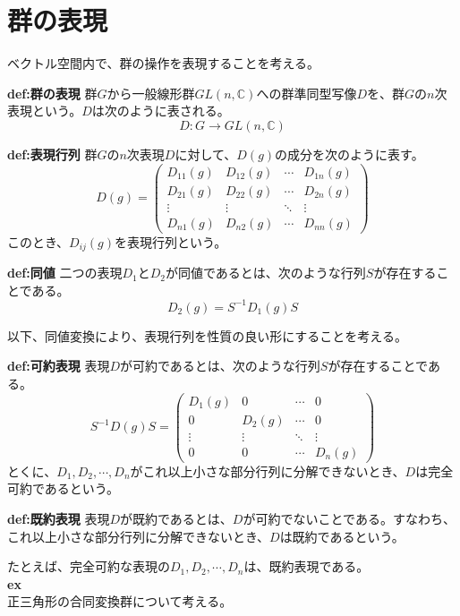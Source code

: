\documentclass[a4paper,11pt]{jsarticle}
\begin{document}
\section{群の表現}
ベクトル空間内で、群の操作を表現することを考える。\\
\begin{itembox}[l]{\textbf{def:群の表現}}
    群$G$から一般線形群$GL(n,\mathbb{C})$への群準同型写像$D$を、群$G$の$n$次表現という。$D$は次のように表される。
    \begin{equation}
        D:G \to GL(n,\mathbb{C})
    \end{equation}
\end{itembox}
\begin{itembox}[l]{\textbf{def:表現行列}}
    群$G$の$n$次表現$D$に対して、$D(g)$の成分を次のように表す。
    \begin{equation}
        D(g) = \begin{pmatrix}
            D_{11}(g) & D_{12}(g) & \cdots & D_{1n}(g)\\
            D_{21}(g) & D_{22}(g) & \cdots & D_{2n}(g)\\
            \vdots & \vdots & \ddots & \vdots\\
            D_{n1}(g) & D_{n2}(g) & \cdots & D_{nn}(g)
        \end{pmatrix}
    \end{equation}
    このとき、$D_{ij}(g)$を表現行列という。
\end{itembox}
\begin{itembox}[l]{\textbf{def:同値}}
    二つの表現$D_1$と$D_2$が同値であるとは、次のような行列$S$が存在することである。
    \begin{equation}
        D_2(g) = S^{-1}D_1(g)S
    \end{equation}
\end{itembox}
以下、同値変換により、表現行列を性質の良い形にすることを考える。\\
\begin{itembox}[l]{\textbf{def:可約表現}}
    表現$D$が可約であるとは、次のような行列$S$が存在することである。
    \begin{equation}
        S^{-1}D(g)S = \begin{pmatrix}
            D_1(g) & 0 & \cdots & 0\\
            0 & D_2(g) & \cdots & 0\\
            \vdots & \vdots & \ddots & \vdots\\
            0 & 0 & \cdots & D_n(g)
        \end{pmatrix}
    \end{equation}
    とくに、$D_1,D_2,\cdots,D_n$がこれ以上小さな部分行列に分解できないとき、$D$は完全可約であるという。
\end{itembox}
\begin{itembox}[l]{\textbf{def:既約表現}}
    表現$D$が既約であるとは、$D$が可約でないことである。すなわち、これ以上小さな部分行列に分解できないとき、$D$は既約であるという。
\end{itembox}
たとえば、完全可約な表現の$D_1,D_2,\cdots,D_n$は、既約表現である。\\
\textbf{ex}\\
正三角形の合同変換群について考える。\\%
\end{document}
